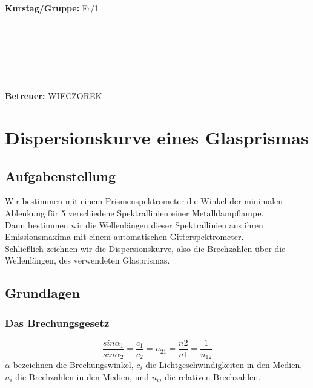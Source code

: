 \documentclass{article}
\begin{document}
\begin{verbatim}


\end{verbatim}
			\begin{flushleft}
			\textbf{\Large{Kurstag/Gruppe:}} \Large{Fr/1}
			\end{flushleft}

\begin{verbatim}






\end{verbatim}
			\begin{flushleft}
			\LARGE{\textbf{Betreuer:}}	\Large{WIECZOREK}	
			\end{flushleft}
\newpage	

\section{Dispersionskurve eines Glasprismas}

\subsection{Aufgabenstellung}
Wir bestimmen mit einem Prismenspektrometer die Winkel der minimalen Ablenkung für 5 verschiedene Spektrallinien einer Metalldampflampe.\\ Dann bestimmen wir die Wellenlängen dieser Spektrallinien aus ihren Emissionsmaxima mit einem automatischen Gitterspektrometer.\\ Schließlich zeichnen wir die Dispersionskurve, also die Brechzahlen über die Wellenlängen, des verwendeten Glasprismas. 
\subsection{Grundlagen}
\subsubsection*{Das Brechungsgesetz}
\begin{equation}
\label{brechungsgesetz}
\frac{sin\alpha_1}{sin\alpha_2}=\frac{c_1}{c_2}=n_{21}=\frac{n2}{n1}=\frac{1}{n_{12}}
\end{equation}
$\alpha$ bezeichnen die Brechungswinkel, $c_i$ die Lichtgeschwindigkeiten in den Medien, $n_i$ die Brechzahlen in den Medien, und $n_{ij}$ die relativen Brechzahlen. \\
\\
\end{document}
